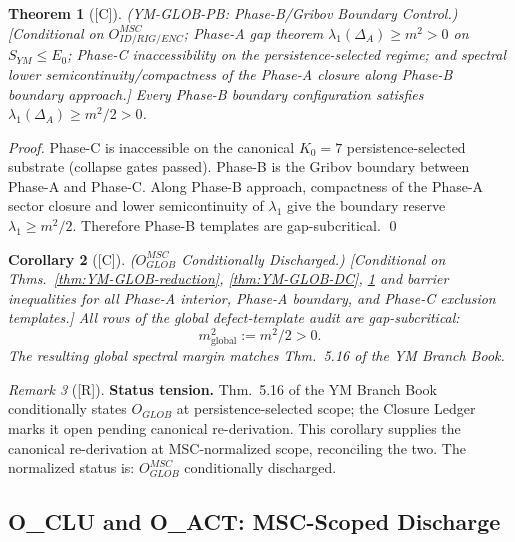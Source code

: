 \documentclass[12pt,oneside]{amsbook}
\theoremstyle{plain}
\newtheorem{theorem}{Theorem}[section]
\newtheorem{corollary}[theorem]{Corollary}
\theoremstyle{definition}
\theoremstyle{remark}
\newtheorem{remark}[theorem]{Remark}
\newcommand{\status}[1]{\textup{[#1]}}
\begin{document}
\begin{theorem}[\status{C}]\label{thm:YM-GLOB-PB}
\textup{(YM-GLOB-PB: Phase-B/Gribov Boundary Control.)}
\textup{[Conditional on $O_{ID/RIG/ENC}^{MSC}$; Phase-A gap theorem
$\lambda_1(\Delta_A) \ge m^2 > 0$ on $S_{YM} \le E_0$; Phase-C
inaccessibility on the persistence-selected regime; and
spectral lower semicontinuity/compactness of the Phase-A closure
along Phase-B boundary approach.]}
Every Phase-B boundary configuration satisfies
$\lambda_1(\Delta_A) \ge m^2/2 > 0$.
\end{theorem}

\begin{proof}
Phase-C is inaccessible on the canonical $K_0=7$ persistence-selected
substrate (collapse gates passed). Phase-B is the Gribov boundary
between Phase-A and Phase-C. Along Phase-B approach, compactness
of the Phase-A sector closure and lower semicontinuity of $\lambda_1$
give the boundary reserve $\lambda_1 \ge m^2/2$. Therefore Phase-B
templates are gap-subcritical.
\qed
\end{proof}

\begin{corollary}[\status{C}]\label{cor:YM-GLOB-MSC}
\textup{($O_{GLOB}^{MSC}$ Conditionally Discharged.)}
\textup{[Conditional on Thms.~\ref{thm:YM-GLOB-reduction},
\ref{thm:YM-GLOB-DC}, \ref{thm:YM-GLOB-PB} and barrier
inequalities for all Phase-A interior, Phase-A boundary, and
Phase-C exclusion templates.]}
All rows of the global defect-template audit are gap-subcritical:
\[
 m^2_{\mathrm{global}} := m^2/2 > 0.
\]
The resulting global spectral margin matches Thm.~5.16 of the YM Branch Book.
\end{corollary}

\begin{remark}[\status{R}]\label{rem:YM-GLOB-status-tension}
\textbf{Status tension.}
Thm.~5.16 of the YM Branch Book conditionally states
$O_{GLOB}$ at persistence-selected scope; the Closure Ledger
marks it open pending canonical re-derivation. This corollary
supplies the canonical re-derivation at MSC-normalized scope,
reconciling the two. The normalized status is:
$O_{GLOB}^{MSC}$ conditionally discharged.
\end{remark}

\subsection{O\_{CLU} and O\_{ACT}: MSC-Scoped Discharge}
\end{document}

